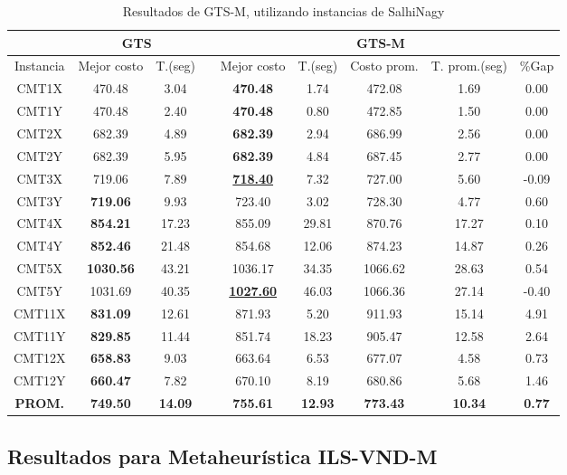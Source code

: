 \begin{table}[h]
\caption{ Resultados de GTS-M, utilizando instancias de SalhiNagy}
\centering
\scriptsize
\begin{tabular*}{1.00\textwidth}{@{\extracolsep{\fill}} |c||c c||c c c c c c|}
\hline
& \multicolumn{2}{c||}{\bf{GTS}} & \multicolumn{6}{c|}{\bf{GTS-M}}\\\hline
Instancia & Mejor costo & T.(seg) & & Mejor costo & T.(seg) & Costo prom. & T. prom.(seg) & \%Gap\\ [0.5ex]
\hline\hline
CMT1X & 470.48 & 3.04 & & \bf{470.48} & 
1.74 & 472.08 & 1.69 & 0.00\\CMT1Y & 470.48 & 2.40 & & \bf{470.48} & 
0.80 & 472.85 & 1.50 & 0.00\\CMT2X & 682.39 & 4.89 & & \bf{682.39} & 
2.94 & 686.99 & 2.56 & 0.00\\CMT2Y & 682.39 & 5.95 & & \bf{682.39} & 
4.84 & 687.45 & 2.77 & 0.00\\CMT3X & 719.06 & 7.89 & & \bf{\underline{718.40}} & 
7.32 & 727.00 & 5.60 & -0.09\\CMT3Y & \bf{719.06} & 9.93 & & 
723.40 & 3.02 & 728.30 & 4.77 & 0.60\\CMT4X & \bf{854.21} & 17.23 & & 
855.09 & 29.81 & 870.76 & 17.27 & 0.10\\CMT4Y & \bf{852.46} & 21.48 & & 
854.68 & 12.06 & 874.23 & 14.87 & 0.26\\CMT5X & \bf{1030.56} & 43.21 & & 
1036.17 & 34.35 & 1066.62 & 28.63 & 0.54\\CMT5Y & 1031.69 & 40.35 & & \bf{\underline{1027.60}} & 
46.03 & 1066.36 & 27.14 & -0.40\\CMT11X & \bf{831.09} & 12.61 & & 
871.93 & 5.20 & 911.93 & 15.14 & 4.91\\CMT11Y & \bf{829.85} & 11.44 & & 
851.74 & 18.23 & 905.47 & 12.58 & 2.64\\CMT12X & \bf{658.83} & 9.03 & & 
663.64 & 6.53 & 677.07 & 4.58 & 0.73\\CMT12Y & \bf{660.47} & 7.82 & & 
670.10 & 8.19 & 680.86 & 5.68 & 1.46\\\hline\hline\bf{PROM.} & 
\bf{749.50} & \bf{14.09} & & \bf{755.61} & \bf{12.93} & \bf{773.43} & \bf{10.34} & \bf{0.77}\\[1ex]\hline
\end{tabular*}
\label{tabla-final-gtsS}
\end{table}

\subsection{Resultados para Metaheurística ILS-VND-M} 


